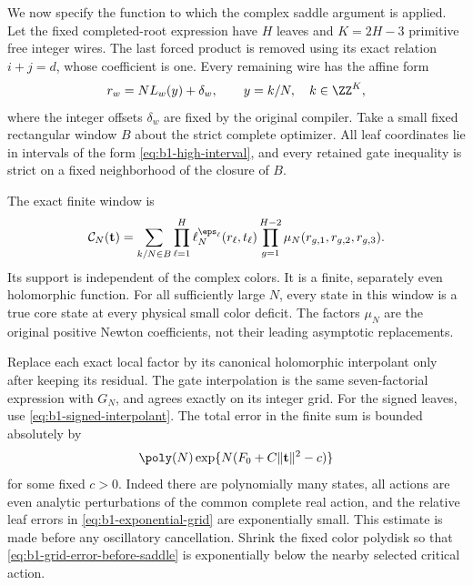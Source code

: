 We now specify the function to which the complex saddle argument is
applied. Let the fixed completed-root expression have $H$ leaves and
$K=2H-3$ primitive free integer wires. The last forced product is removed
using its exact relation $i+j=d$, whose coefficient is one. Every
remaining wire has the affine form
\[
 r_w=NL_w(y)+\delta_w,
 \qquad y=k/N,\quad k\in\ZZ^K,
\]
where the integer offsets $\delta_w$ are fixed by the original compiler.
Take a small fixed rectangular window $B$ about the strict complete
optimizer. All leaf coordinates lie in intervals of the form
\eqref{eq:b1-high-interval}, and every retained gate inequality is
strict on a fixed neighborhood of the closure of $B$.

The exact finite window is
\begin{equation}\label{eq:b1-exact-window}
 \mathcal C_N(\mathbf t)
 =\sum_{k/N\in B}
  \prod_{\ell=1}^{H}\ell_N^{\eps_\ell}(r_\ell,t_\ell)
  \prod_{g=1}^{H-2}\mu_N(r_{g,1},r_{g,2},r_{g,3}).
\end{equation}
Its support is independent of the complex colors. It is a finite,
separately even holomorphic function. For all sufficiently large $N$,
every state in this window is a true core state at every physical small
color deficit. The factors $\mu_N$ are the original positive Newton
coefficients, not their leading asymptotic replacements.

Replace each exact local factor by its canonical holomorphic
interpolant only after keeping its residual. The gate interpolation is
the same seven-factorial expression with $G_N$, and agrees exactly on
its integer grid. For the signed leaves, use
\eqref{eq:b1-signed-interpolant}. The total error in the finite sum is
bounded absolutely by
\begin{equation}\label{eq:b1-grid-error-before-saddle}
 \poly(N)\exp\{N(F_0+C\|\mathbf t\|^2-c)\}
\end{equation}
for some fixed $c>0$. Indeed there are polynomially many states, all
actions are even analytic perturbations of the common complete real
action, and the relative leaf errors in
\eqref{eq:b1-exponential-grid} are exponentially small. This estimate
is made before any oscillatory cancellation. Shrink the fixed color
polydisk so that \eqref{eq:b1-grid-error-before-saddle} is exponentially
below the nearby selected critical action.

